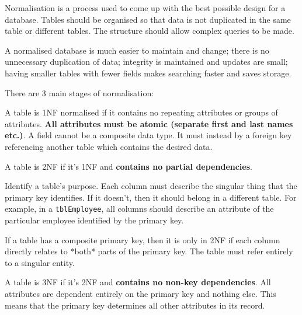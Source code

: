 \documentclass[../main.tex]{subfile}
\begin{document}

Normalisation is a process used to come up with the best possible design for a database. Tables should be organised so that data is not duplicated in the same table or different tables. The structure should allow complex queries to be made.

A normalised database is much easier to maintain and change; there is no unnecessary duplication of data; integrity is maintained and updates are small; having smaller tables with fewer fields makes searching faster and saves storage.

There are 3 main stages of normalisation:


A table is 1NF normalised if it contains no repeating attributes or groups of attributes. \textbf{All attributes must be atomic (separate first and last names etc.)}. A field cannot be a composite data type. It must instead by a foreign key referencing another table which contains the desired data.


A table is 2NF if it's 1NF and \textbf{contains no partial dependencies}.

Identify a table's purpose. Each column must describe the singular thing that the primary key identifies. If it doesn't, then it should belong in a different table. For example, in a \texttt{tblEmployee}, all columns should describe an attribute of the particular employee identified by the primary key.

If a table has a composite primary key, then it is only in 2NF if each column directly relates to *both* parts of the primary key. The table must refer entirely to a singular entity.


A table is 3NF if it's 2NF and \textbf{contains no non-key dependencies}. All attributes are dependent entirely on the primary key and nothing else. This means that the primary key determines all other attributes in its record.
\end{document}
